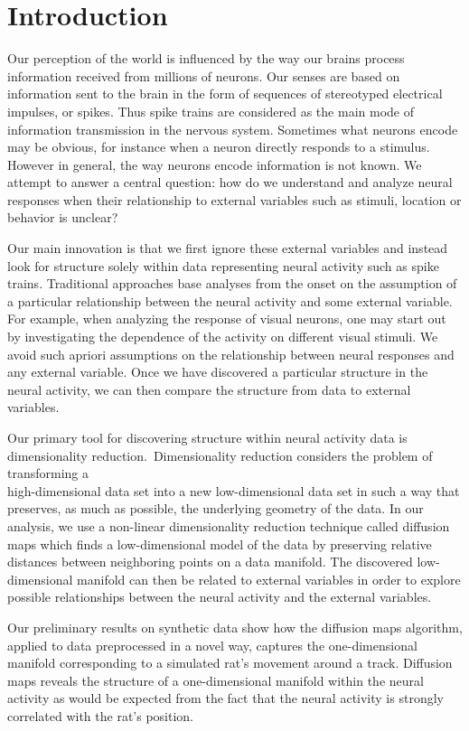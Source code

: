 
\section{Introduction}
 Our perception of the world is influenced by the way our brains process information received from millions of neurons.
 Our senses are based on information sent to the brain in the form of sequences of stereotyped electrical impulses, or spikes.
Thus spike trains are considered as the main mode of information transmission in the nervous system.  Sometimes what neurons encode may be obvious, for instance when a neuron directly responds to a stimulus. However in general,  the way neurons encode information is not known. We attempt to answer a central question: how do we understand
and analyze neural responses when their relationship to external variables such as stimuli, location or behavior  is unclear? 


Our main innovation is that we  first ignore these external variables and instead look for structure solely within data representing neural activity such as spike trains. Traditional approaches base analyses from the onset on the assumption of a particular relationship between the neural activity and some external variable.
For example, when analyzing the response of visual neurons, one may start out by investigating the dependence of the activity on different visual stimuli. We avoid such apriori assumptions on the relationship between neural responses and any external variable.  Once we have discovered a particular structure in the neural activity, we can then compare the structure
from data to external variables. 


Our primary tool for discovering structure within neural activity data is dimensionality reduction.\ Dimensionality reduction considers the problem of  transforming a\\high-dimen\-sional data set into a new low-dimen\-sional data set in  such a way that preserves, as much as possible, the underlying geometry of the data. In our analysis, we use a non-linear dimensionality reduction technique called diffusion maps which finds a low-dimen\-sional model of the  data by preserving relative distances between neighboring points on a data manifold. The discovered low-dimen\-sional manifold
can then be related to external variables in order to explore possible relationships between the neural activity and the
external variables.


Our preliminary results on synthetic data show how the diffusion maps algorithm, applied to data preprocessed in a novel way, captures the  one-dimen\-sional manifold corresponding to a simulated rat's movement around a track. Diffusion maps reveals the structure of a one-dimen\-sional manifold within the neural activity as would be expected from the fact that the neural activity is strongly correlated with the rat's position.    


